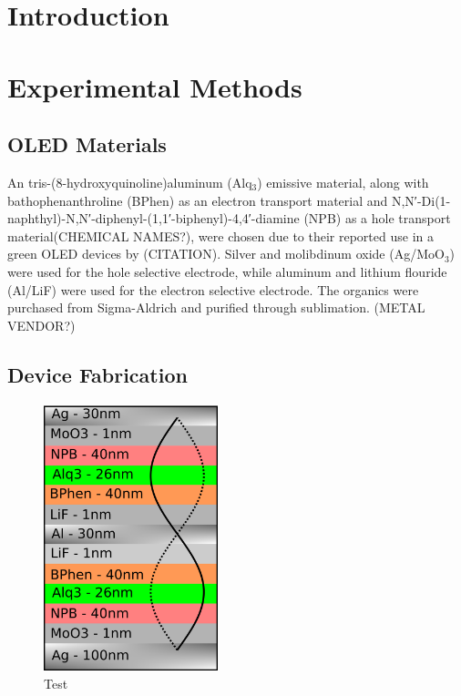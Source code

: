 \documentclass{report}
\begin{document}
\tableofcontents

\chapter{Introduction}

\chapter{Experimental Methods}

    \section{OLED Materials}
    An tris-(8-hydroxyquinoline)aluminum (Alq$_3$) emissive material, along with bathophenanthroline (BPhen) as an electron transport material and N,N′-Di(1-naphthyl)-N,N′-diphenyl-(1,1′-biphenyl)-4,4′-diamine (NPB) as a hole transport material(CHEMICAL NAMES?), were chosen due to their reported use in a green OLED devices by (CITATION). Silver and molibdinum oxide (Ag/MoO$_3$) were used for the hole selective electrode, while aluminum and lithium flouride (Al/LiF) were used for the electron selective electrode. The organics were purchased from Sigma-Aldrich and purified through sublimation. (METAL VENDOR?)

    \section{Device Fabrication}
    \begin{figure}
        \centering
        \includegraphics[width=0.45\textwidth]{images/schematic.png}
        \caption{Test}
    \end{figure}
\end{document}
